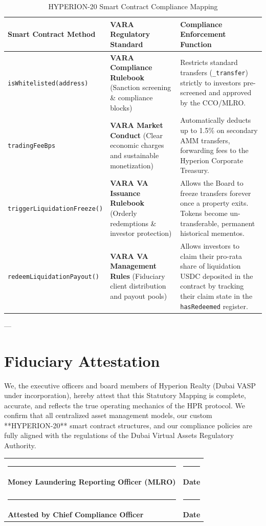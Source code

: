 \documentclass[11pt,a4paper]{article}
\begin{document}
\begin{table}[h!]
\centering
\begin{tabularx}{\textwidth}{l p{5cm} X}
\toprule
\textbf{Smart Contract Method} & \textbf{VARA Regulatory Standard} & \textbf{Compliance Enforcement Function} \\
\midrule
\texttt{isWhitelisted(address)} & \textbf{VARA Compliance Rulebook} (Sanction screening \& compliance blocks) & Restricts standard transfers (\texttt{\_transfer}) strictly to investors pre-screened and approved by the CCO/MLRO. \\
\midrule
\texttt{tradingFeeBps} & \textbf{VARA Market Conduct} (Clear economic charges and sustainable monetization) & Automatically deducts up to 1.5\% on secondary AMM transfers, forwarding fees to the Hyperion Corporate Treasury. \\
\midrule
\texttt{triggerLiquidationFreeze()} & \textbf{VARA VA Issuance Rulebook} (Orderly redemptions \& investor protection) & Allows the Board to freeze transfers forever once a property exits. Tokens become un-transferable, permanent historical mementos. \\
\midrule
\texttt{redeemLiquidationPayout()} & \textbf{VARA VA Management Rules} (Fiduciary client distribution and payout pools) & Allows investors to claim their pro-rata share of liquidation USDC deposited in the contract by tracking their claim state in the \texttt{hasRedeemed} register. \\
\bottomrule
\end{tabularx}
\caption{HYPERION-20 Smart Contract Compliance Mapping}
\end{table}

---

\section{Fiduciary Attestation}
We, the executive officers and board members of Hyperion Realty (Dubai VASP under incorporation), hereby attest that this Statutory Mapping is complete, accurate, and reflects the true operating mechanics of the HPR protocol. We confirm that all centralized asset management models, our custom **HYPERION-20** smart contract structures, and our compliance policies are fully aligned with the regulations of the Dubai Virtual Assets Regulatory Authority.

\par\vspace{1.5cm}
\noindent
\begin{tabularx}{\textwidth}{X X}
    \rule{4cm}{0.4pt} & \rule{4cm}{0.4pt} \\
    \textbf{Money Laundering Reporting Officer (MLRO)} & \textbf{Date} \\
    & \\
    \rule{4cm}{0.4pt} & \rule{4cm}{0.4pt} \\
    \textbf{Attested by Chief Compliance Officer} & \textbf{Date}
\end{tabularx}

\makehyperionseal
\end{document}
